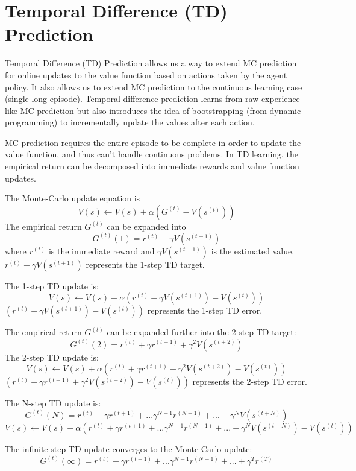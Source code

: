 \documentclass[11pt]{article}
\begin{document}
\section{Temporal Difference (TD) Prediction}
Temporal Difference (TD) Prediction allows us a way to extend MC prediction for online updates to the value function based on actions taken by the agent policy. It also allows us to extend MC prediction to the continuous learning case (single long episode). Temporal difference prediction learns from raw experience like MC prediction but also introduces the idea of bootstrapping (from dynamic programming) to incrementally update the values after each action. 

MC prediction requires the entire episode to be complete in order to update the value function, and thus can't handle continuous problems. In TD learning, the empirical return can be decomposed into immediate rewards and value function updates.

The Monte-Carlo update equation is 
$$V(s) \leftarrow V(s) + \alpha(G^{(t)}-V(s^{(t)}))$$
The empirical return $G^{(t)}$ can be expanded into 
$$G^{(t)}(1) = r^{(t)} + \gamma V(s^{(t+1)})$$
where $r^{(t)}$ is the immediate reward and $\gamma V(s^{(t+1)})$ is the estimated value. $r^{(t)} + \gamma V(s^{(t+1)})$ represents the 1-step TD target.

The 1-step TD update is:
$$V(s) \leftarrow V(s) + \alpha(r^{(t)} + \gamma V(s^{(t+1)})-V(s^{(t)}))$$
$(r^{(t)} + \gamma V(s^{(t+1)})-V(s^{(t)}))$ represents the 1-step TD error.

The empirical return $G^{(t)}$ can be expanded further into the 2-step TD target:
$$G^{(t)}(2) = r^{(t)} + \gamma r^{(t+1)} + \gamma^2 V(s^{(t+2)})$$
The 2-step TD update is:
$$V(s) \leftarrow V(s) + \alpha(r^{(t)} + \gamma r^{(t+1)} + \gamma^2 V(s^{(t+2)})-V(s^{(t)}))$$
$(r^{(t)} + \gamma r^{(t+1)} + \gamma^2 V(s^{(t+2)})-V(s^{(t)}))$ represents the 2-step TD error.

The N-step TD update is:
$$G^{(t)}(N) = r^{(t)} + \gamma r^{(t+1)}+...\gamma^{N-1} r^{(N-1)}+... + \gamma^N V(s^{(t+N)})$$
$$V(s) \leftarrow V(s) + \alpha(r^{(t)} + \gamma r^{(t+1)}+...\gamma^{N-1} r^{(N-1)}+... + \gamma^N V(s^{(t+N)})-V(s^{(t)}))$$

The infinite-step TD update converges to the Monte-Carlo update:
$$G^{(t)}(\infty) = r^{(t)} + \gamma r^{(t+1)}+...\gamma^{N-1} r^{(N-1)}+... + \gamma^T r^{(T)}$$
\end{document}
